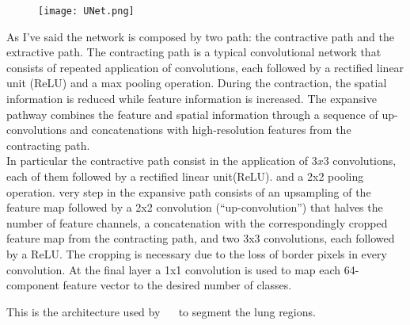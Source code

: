 \documentclass{standalone}
\begin{document}
	
	\begin{figure}[h!]
		\centering
			\texttt{[image: UNet.png]}
			\caption{}\label{fig:UNet}
	\end{figure}

	As I've said the network is composed by two path: the contractive path and the extractive path. The contracting path is a typical convolutional network that consists of repeated application of convolutions, each followed by a rectified linear unit (ReLU) and a max pooling operation. During the contraction, the spatial information is reduced while feature information is increased. The expansive pathway combines the feature and spatial information through a sequence of up-convolutions and concatenations with high-resolution features from the contracting path.\\
	
	In particular the contractive path consist in the application of $3x3$ convolutions, each of them followed by a rectified linear unit(ReLU). and a 2x2 pooling operation. very step in the expansive path consists of an upsampling of the feature map followed by a 2x2 convolution (“up-convolution”) that halves the number of feature channels, a concatenation with the correspondingly cropped feature map from the contracting path, and two 3x3 convolutions, each followed by a ReLU. The cropping is necessary due to the loss of border pixels in every convolution. At the final layer a 1x1 convolution is used to map each 64-component feature vector to the desired number of classes. 
	
	This is the architecture used by ~\cite{ART:Johannes}~\cite{REP:lungmask} to segment the lung regions. 
\end{document}
